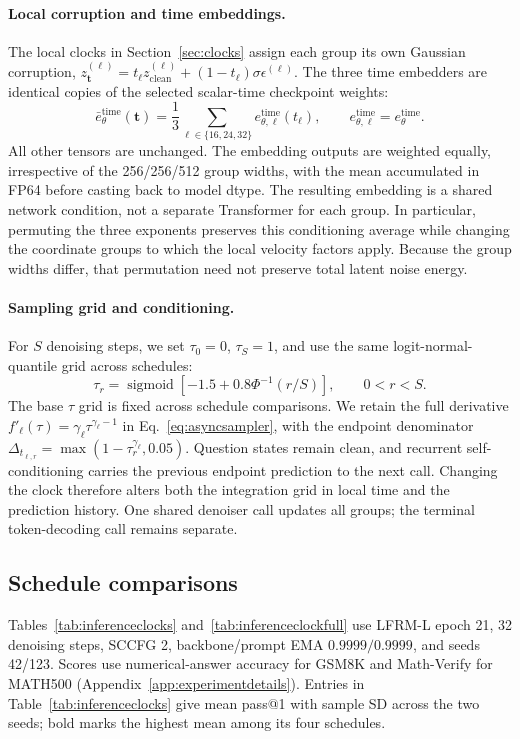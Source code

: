 \documentclass{article}
\begin{document}
\paragraph{Local corruption and time embeddings.}
The local clocks in Section~\ref{sec:clocks} assign each group its own Gaussian corruption, $z_{\bm t}^{(\ell)}=t_\ell z_{\mathrm{clean}}^{(\ell)}+(1-t_\ell)\sigma\epsilon^{(\ell)}$. The three time embedders are identical copies of the selected scalar-time checkpoint weights:
\begin{equation}
 \bar e_\theta^{\mathrm{time}}(\bm t)
 =\frac{1}{3}\sum_{\ell\in\{16,24,32\}}e_{\theta,\ell}^{\mathrm{time}}(t_\ell),
 \qquad e_{\theta,\ell}^{\mathrm{time}}=e_\theta^{\mathrm{time}}.
 \label{eq:asynctimeembedding}
\end{equation}
All other tensors are unchanged. The embedding outputs are weighted equally, irrespective of the 256/256/512 group widths, with the mean accumulated in FP64 before casting back to model dtype. The resulting embedding is a shared network condition, not a separate Transformer for each group. In particular, permuting the three exponents preserves this conditioning average while changing the coordinate groups to which the local velocity factors apply. Because the group widths differ, that permutation need not preserve total latent noise energy.

\paragraph{Sampling grid and conditioning.}
For $S$ denoising steps, we set $\tau_0=0$, $\tau_S=1$, and use the same logit-normal-quantile grid across schedules:
\begin{equation}
 \tau_r=\operatorname{sigmoid}\!\left[-1.5+0.8\Phi^{-1}(r/S)\right],
 \qquad 0<r<S.
\end{equation}
The base $\tau$ grid is fixed across schedule comparisons. We retain the full derivative $f'_\ell(\tau)=\gamma_\ell\tau^{\gamma_\ell-1}$ in Eq.~\eqref{eq:asyncsampler}, with the endpoint denominator $\Delta_{t_{\ell,r}}=\max(1-\tau_r^{\gamma_\ell},0.05)$. Question states remain clean, and recurrent self-conditioning carries the previous endpoint prediction to the next call. Changing the clock therefore alters both the integration grid in local time and the prediction history. One shared denoiser call updates all groups; the terminal token-decoding call remains separate.

\subsection{Schedule comparisons}
Tables~\ref{tab:inferenceclocks} and~\ref{tab:inferenceclockfull} use LFRM-L epoch 21, 32 denoising steps, SCCFG 2, backbone/prompt EMA $0.9999/0.9999$, and seeds 42/123. Scores use numerical-answer accuracy for GSM8K and Math-Verify for MATH500 (Appendix~\ref{app:experimentdetails}). Entries in Table~\ref{tab:inferenceclocks} give mean pass@1 with sample SD across the two seeds; bold marks the highest mean among its four schedules.
\end{document}
